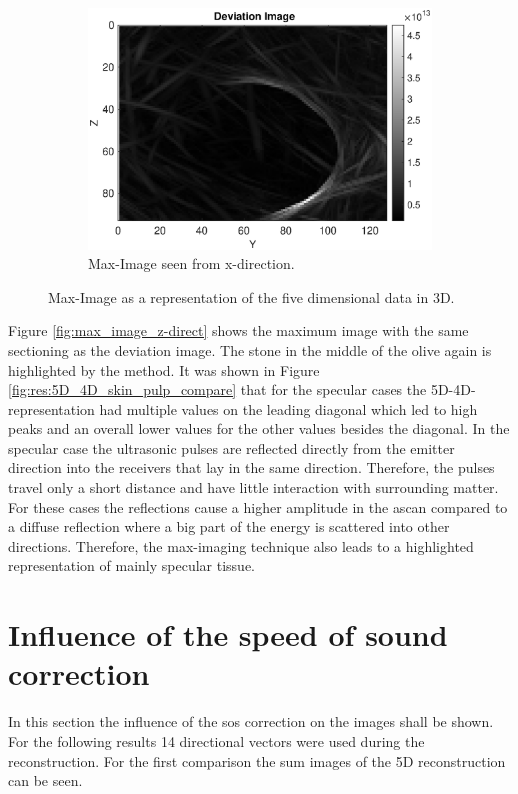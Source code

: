 \begin{figure}[H]
\begin{subfigure}[b]{0.61\textwidth}
        \includegraphics[width=1.13\textwidth]{Graphics/Results/Variance_Image/Max_Ortho_slice_x_63.eps}
        \caption{Max-Image seen from x-direction. }
        \label{fig:max_image_x_direkt}
     \end{subfigure}
        \caption{Max-Image as a representation of the five dimensional data in 3D.}
        \label{fig:max_image}
\end{figure}

Figure \ref{fig:max_image_z-direct} shows the maximum image with the same sectioning as the deviation image. The stone in the middle of the olive again is highlighted by the method. It was shown in Figure \ref{fig:res:5D_4D_skin_pulp_compare} that for the specular cases the 5D-4D-representation had multiple values on the leading diagonal which led to high peaks and an overall lower values for the other values besides the diagonal. In the specular case the ultrasonic pulses are reflected directly from the emitter direction into the receivers that lay in the same direction. Therefore, the pulses travel only a short distance and have little interaction with surrounding matter. For these cases the reflections cause a higher amplitude in the \ac{ascan} compared to a diffuse reflection where a big part of the energy is scattered into other directions. Therefore, the max-imaging technique also leads to a highlighted representation of mainly specular tissue. 




      
\section{Influence of the speed of sound correction }
In this section the influence of the \ac{sos} correction on the images shall be shown. For the following results 14 directional vectors were used during the reconstruction. For the first comparison the sum images of the 5D reconstruction can be seen.


